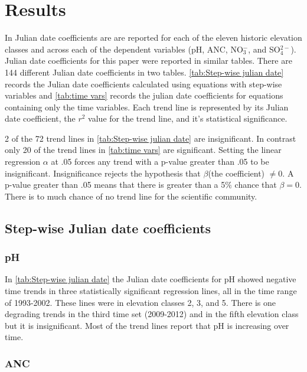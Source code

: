 \section{Results}

In \citet{robinson2008ph} Julian date coefficients are are reported for each of the eleven historic elevation classes and across each of the dependent variables (pH, ANC, NO$_3^-$, and SO$_4^{2-}$).  Julian date coefficients for this paper were reported in similar tables.  There are 144 different Julian date coefficients in two tables.  \autoref{tab:Step-wise julian date} records the Julian date coefficients calculated using equations with step-wise variables and \autoref{tab:time vars} records the julian date coefficients for  equations containing only the time variables.  Each trend line is represented by its Julian date coefficient, the $r^2$ value for the trend line, and it's statistical significance.

2 of the 72 trend lines in \autoref{tab:Step-wise julian date} are insignificant.  In contrast only 20 of the trend lines in \autoref{tab:time vars} are significant.   Setting the linear regression $\alpha$ at .05 forces any trend with a p-value greater than .05 to be insignificant.  Insignificance rejects the hypothesis that $\beta$(the coefficient) $\neq 0$.  A p-value greater than .05 means that there is greater than a 5$\%$ chance that $\beta=0$.  There is to much chance of no trend line for the scientific community.

\subsection{Step-wise Julian date coefficients}

\subsubsection{pH}

In \autoref{tab:Step-wise julian date} the Julian date coefficients for pH showed negative time trends in three statistically significant regression lines, all in the time range of 1993-2002.  These lines were in elevation classes 2, 3, and 5.  There is one degrading trends in the third time set (2009-2012) and in the fifth elevation class but it is insignificant.   Most of the trend lines report that pH is increasing over time.

\subsubsection{ANC}

